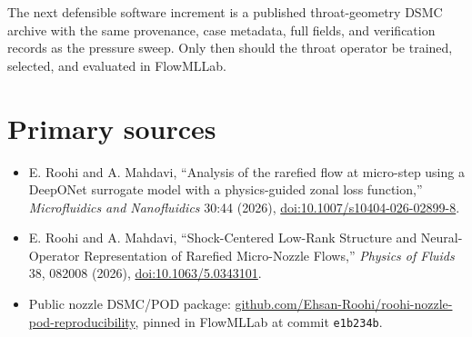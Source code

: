 \documentclass[11pt]{article}
\begin{document}
\begin{decisionbox}
The next defensible software increment is a published throat-geometry DSMC
archive with the same provenance, case metadata, full fields, and verification
records as the pressure sweep. Only then should the throat operator be trained,
selected, and evaluated in FlowMLLab.
\end{decisionbox}

\section*{Primary sources}
\begin{itemize}
\item E. Roohi and A. Mahdavi, ``Analysis of the rarefied flow at micro-step using a DeepONet surrogate model with a physics-guided zonal loss function,'' \emph{Microfluidics and Nanofluidics} 30:44 (2026), \href{https://doi.org/10.1007/s10404-026-02899-8}{doi:10.1007/s10404-026-02899-8}.
\item E. Roohi and A. Mahdavi, ``Shock-Centered Low-Rank Structure and Neural-Operator Representation of Rarefied Micro-Nozzle Flows,'' \emph{Physics of Fluids} 38, 082008 (2026), \href{https://doi.org/10.1063/5.0343101}{doi:10.1063/5.0343101}.
\item Public nozzle DSMC/POD package: \href{https://github.com/Ehsan-Roohi/roohi-nozzle-pod-reproducibility}{github.com/Ehsan-Roohi/roohi-nozzle-pod-reproducibility}, pinned in FlowMLLab at commit \texttt{e1b234b}.
\end{itemize}
\end{document}

